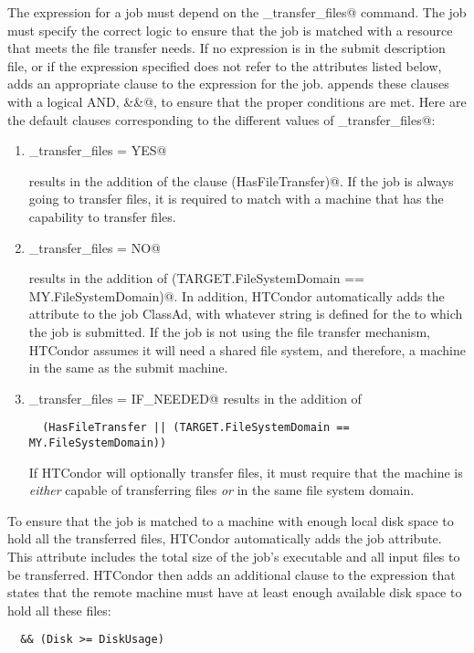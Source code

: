 The  expression for a job must depend
on the \verb@should_transfer_files@ command.
The job must specify the correct logic to ensure that the job is matched
with a resource that meets the file transfer needs.
If no  expression is in the submit description file,
or if the expression specified does not refer to the
attributes listed below,  adds an
appropriate clause to the  expression for the job.
 appends these clauses with a logical AND, \verb@&&@,
to ensure that the proper conditions are met.
Here are the default clauses corresponding to the different values of
\verb@should_transfer_files@:

\begin{enumerate}

\item 
\verb@should_transfer_files = YES@ 

  results in the addition of the clause \verb@(HasFileTransfer)@.
  If the job is always going to transfer files, it is required to 
  match with a machine that has the capability to transfer files.

\item 
\verb@should_transfer_files = NO@

  results in the addition of
  \verb@(TARGET.FileSystemDomain == MY.FileSystemDomain)@.
  In addition, HTCondor automatically adds the
   attribute to the job ClassAd, with whatever
  string is defined for the  to which the job is
  submitted.
  If the job is not using the file transfer mechanism, HTCondor assumes
  it will need a shared file system, and therefore, a machine in the
  same  as the submit machine.

\item \verb@should_transfer_files = IF_NEEDED@
  results in the addition of
\footnotesize
\begin{verbatim}
  (HasFileTransfer || (TARGET.FileSystemDomain == MY.FileSystemDomain))
\end{verbatim}
\normalsize
  If HTCondor will optionally transfer files, it must require
  that the machine is \emph{either} capable of transferring files
  \emph{or} in the same file system domain.

\end{enumerate}

To ensure that the job is matched to a machine with enough local disk
space to hold all the transferred files, HTCondor automatically adds the
 job attribute.
This attribute includes the total
size of the job's executable and all input files to be transferred.
HTCondor then adds an additional clause to the 
expression that states that the remote machine must have at least
enough available disk space to hold all these files:
\begin{verbatim}
  && (Disk >= DiskUsage)
\end{verbatim}

